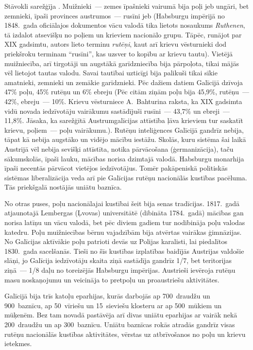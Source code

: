 \documentclass[twoside,a5paper,12pt,fleqn,openany]{extbook}
\newcommand{\detxti}[1]{\textit{\textgerman{#1}}}
\newcommand{\lttxti}[1]{\textit{\textlithuanian{#1}}}
\begin{document}
Stāvokli sarežģīja . Muižnieki~--- zemes īpašnieki vairumā bija poļi jeb ungāri, bet zemnieki, īpaši provinces austrumos~--- rusīni jeb  (Habsburgu impērijā no 1848.~gada oficiālajos dokumentos vācu valodā tika lietots nosaukums \detxti{Ruthenen}, tā izdalot atsevišķu no poļiem un krieviem nacionālo grupu. Tāpēc, runājot par XIX gadsimtu, autors lieto terminu \lttxti{rutēņi}, kaut arī krievu vēsturnieki dod priekšroku terminam ``rusīni'', kas uzsver to kopību ar krievu tautu). Vietējā muižniecība, arī tirgotāji un augstākā garīdzniecība bija pārpoļota, tikai mājās vēl lietojot tautas valodu. Savai tautībai uzticīgi bija palikuši tikai sīkie amatnieki, zemnieki un zemākie garīdznieki. Pēc dažiem datiem Galīcijā dzīvoja 47\% poļu, 45\% rutēņu un 6\% ebreju (Pēc citām ziņām poļu bija 45,9\%, rutēņu~--- 42\%, ebreju~--- 10\%. Krievu vēsturniece A.~Bahturina raksta, ka XIX gadsimta vidū novada iedzīvotāju vairākumu sastādījuši rusīni~--- 43,7\% un ebreji~--- 11,8\%. Jāsaka, ka sarežģītā Austrumgalīcijas attīstība ļāva krieviem tur saskatīt krievu, poļiem~--- poļu vairākumu.). Rutēņu inteliģences Galīcijā gandrīz nebija, tāpat kā nebija augstāko un vidējo mācību iestāžu. Skolās, kuru sistēma šai laikā Austrijā vēl nebija sevišķi attīstīta, notika pārvācošana (ģermanizācija), taču sākumskolās, īpaši lauku, mācības norisa dzimtajā valodā. Habsburgu monarhija īpaši necentās pārvācot vietējos iedzīvotājus. Tomēr pakāpeniskā politiskās sistēmas liberalizācija veda arī pie Galīcijas rutēņu nacionālās kustības pacēluma. Tās priekšgalā nostājās uniātu baznīca.

No otras puses, poļu nacionālajai kustībai šeit bija senas tradīcijas. 1817.~gadā atjaunotajā Lembergas (Ļvovas) universitātē (dibināta 1784.~gadā) mācības gan norisa latīņu un vācu valodā, bet pēc diviem gadiem tur nodibināja poļu valodas katedru. Poļu muižniecības bērnu vajadzībām bija atvērtas vairākas ģimnāzijas. No Galīcijas aktīvākie poļu patrioti devās uz Polijas karalisti, lai piedalītos 1830.~gada sacelšanās. Tieši no šīs kustības izplatības baidījās Austrijas valdošie slāņi, jo Galīcija iedzīvotāju skaita ziņā sastādīja gandrīz 1/7, bet teritorijas ziņā~--- 1/8 daļu no toreizējās Habsburgu impērijas. Austrieši ievēroja rutēņu masu noskaņojumu un veicināja to pretpoļu un proaustriešu aktivitātes.

Galīcijā bija trīs katoļu eparhijas, kurās darbojās ap 700~draudžu un 900~baznīcu, ap 50~vīriešu un 15~sieviešu klosteru ar ap 500~mūkiem un mūķenēm. Bez tam novadā pastāvēja arī divas uniātu eparhijas ar vairāk nekā 200~draudžu un ap 300~baznīcu. Uniātu baznīcas rokās atradās gandrīz visas rutēņu nacionālās kustības aktivitātes, vērstas uz atbrīvošanos no poļu un krievu ietekmes.
\end{document}
